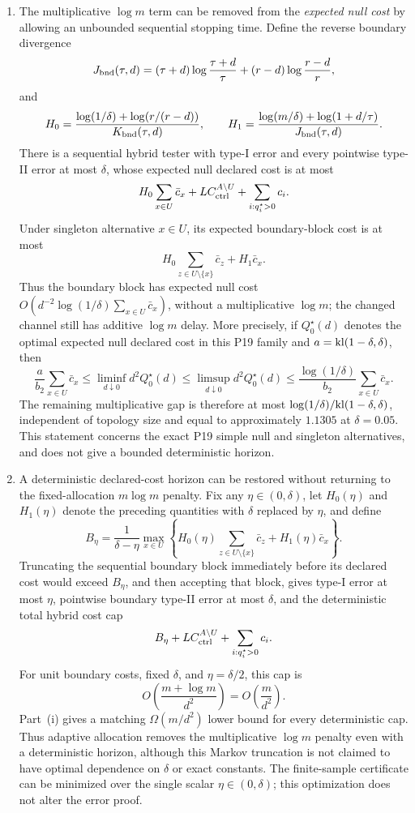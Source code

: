 \begin{theorem}
\begin{enumerate}[label=(\roman*)]
\item The multiplicative \(\log m\) term can be removed from the
\emph{expected null cost} by allowing an unbounded sequential stopping time.
Define the reverse boundary divergence
\[
J_{\rm bnd}(\tau,d)
=
(\tau+d)\log\frac{\tau+d}{\tau}
+(r-d)\log\frac{r-d}{r},
\]
and
\[
H_0=
\frac{\log(1/\delta)+\log(r/(r-d))}{K_{\rm bnd}(\tau,d)},
\qquad
H_1=
\frac{\log(m/\delta)+\log(1+d/\tau)}{J_{\rm bnd}(\tau,d)}.
\]
There is a sequential hybrid tester with type-I error and every pointwise
type-II error at most \(\delta\), whose expected null declared cost is at most
\[
H_0\sum_{x\in U}\bar c_x
+L C_{\rm ctrl}^{A\setminus U}
+\sum_{i:q_i^\star>0}c_i.
\]
Under singleton alternative \(x\in U\), its expected boundary-block cost is
at most
\[
H_0\sum_{z\in U\setminus\{x\}}\bar c_z+H_1\bar c_x.
\]
Thus the boundary block has expected null cost
\(O(d^{-2}\log(1/\delta)\sum_{x\in U}\bar c_x)\), without a
multiplicative \(\log m\); the changed channel still has additive
\(\log m\) delay.  More precisely, if \(Q_0^\star(d)\) denotes the optimal
expected null declared cost in this P19 family and
\(a=\mathrm{kl}(1-\delta,\delta)\), then
\[
\frac{a}{b_2}\sum_{x\in U}\bar c_x
\le
\liminf_{d\downarrow0}d^2Q_0^\star(d)
\le
\limsup_{d\downarrow0}d^2Q_0^\star(d)
\le
\frac{\log(1/\delta)}{b_2}\sum_{x\in U}\bar c_x.
\]
The remaining multiplicative gap is therefore at most
\(\log(1/\delta)/\mathrm{kl}(1-\delta,\delta)\), independent of topology size and
equal to approximately \(1.1305\) at \(\delta=0.05\).  This statement concerns
the exact P19 simple null and singleton alternatives, and does not give a
bounded deterministic horizon.

\item A deterministic declared-cost horizon can be restored without returning
to the fixed-allocation \(m\log m\) penalty.  Fix any
\(\eta\in(0,\delta)\), let \(H_0(\eta)\) and \(H_1(\eta)\) denote the preceding
quantities with \(\delta\) replaced by \(\eta\), and define
\[
B_\eta
=
\frac1{\delta-\eta}
\max_{x\in U}
\left\{
H_0(\eta)\sum_{z\in U\setminus\{x\}}\bar c_z
+H_1(\eta)\bar c_x
\right\}.
\]
Truncating the sequential boundary block immediately before its declared cost
would exceed \(B_\eta\), and then accepting that block, gives type-I error at
most \(\eta\), pointwise boundary type-II error at most \(\delta\), and the
deterministic total hybrid cost cap
\[
B_\eta
+L C_{\rm ctrl}^{A\setminus U}
+\sum_{i:q_i^\star>0}c_i.
\]
For unit boundary costs, fixed \(\delta\), and \(\eta=\delta/2\), this cap is
\[
O\!\left(\frac{m+\log m}{d^2}\right)
=O\!\left(\frac{m}{d^2}\right).
\]
Part~(i) gives a matching \(\Omega(m/d^2)\) lower bound for every deterministic
cap.  Thus adaptive allocation removes the multiplicative \(\log m\) penalty
even with a deterministic horizon, although this Markov truncation is not
claimed to have optimal dependence on \(\delta\) or exact constants.  The
finite-sample certificate can be minimized over the single scalar
\(\eta\in(0,\delta)\); this optimization does not alter the error proof.
\end{enumerate}
\end{theorem}

